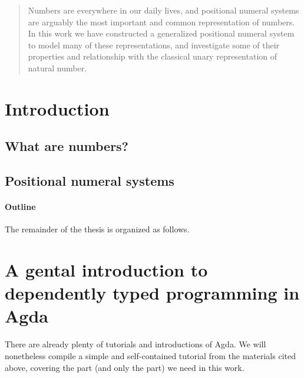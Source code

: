 \documentclass[12pt, a4paper]{article}
\begin{document}
\maketitle

\begin{abstract}
Numbers are everywhere in our daily lives, and positional numeral systems are
arguably the most important and common representation of numbers. In this work
we have constructed a generalized positional numeral system to model many of
these representations, and investigate some of their properties and relationship
with the classical unary representation of natural number.

\end{abstract}

\section{Introduction}

\subsection{What are numbers?}\label{num}


\subsection{Positional numeral systems}\label{pos}


\paragraph{Outline}
The remainder of the thesis is organized as follows.

\section{A gental introduction to dependently typed programming in Agda}\label{agda}

There are already plenty of tutorials and introductions of Agda\cite{norell2009dependently}\cite{FLOLAC16DTP}\cite{brutal}.
We will nonetheless compile a simple and self-contained tutorial from the materials cited above, covering the part (and only the part) we need in this work.
\end{document}
